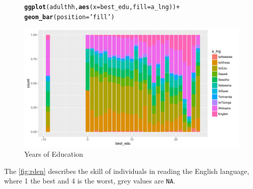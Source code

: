 \documentclass[a4paper,british]{article}\usepackage[]{graphicx}\usepackage[]{color}
\makeatletter
\def\maxwidth{ %
  \ifdim\Gin@nat@width>\linewidth
    \linewidth
  \else
    \Gin@nat@width
  \fi
}
\newcommand{\hlstr}[1]{\textcolor[rgb]{0.192,0.494,0.8}{#1}}%
\newcommand{\hlopt}[1]{\textcolor[rgb]{0,0,0}{#1}}%
\newcommand{\hlstd}[1]{\textcolor[rgb]{0.345,0.345,0.345}{#1}}%
\newcommand{\hlkwc}[1]{\textcolor[rgb]{0.333,0.667,0.333}{#1}}%
\newcommand{\hlkwd}[1]{\textcolor[rgb]{0.737,0.353,0.396}{\textbf{#1}}}%
\newenvironment{kframe}{%
 \def\at@end@of@kframe{}%
 \ifinner\ifhmode%
  \def\at@end@of@kframe{\end{minipage}}%
  \begin{minipage}{\columnwidth}%
 \fi\fi%
 \def\FrameCommand##1{\hskip\@totalleftmargin \hskip-\fboxsep
 \colorbox{shadecolor}{##1}\hskip-\fboxsep
     \hskip-\linewidth \hskip-\@totalleftmargin \hskip\columnwidth}%
 \MakeFramed {\advance\hsize-\width
   \@totalleftmargin\z@ \linewidth\hsize
   \@setminipage}}%
 {\par\unskip\endMakeFramed%
 \at@end@of@kframe}
\newenvironment{knitrout}{}{} %
\newcommand{\code}[1]{\texttt{#1}}
\let\ref\autoref
\makeatother
\begin{document}
\begin{figure}[H]

\caption{Years of Education}

\label{fig:bestedu}

\begin{knitrout}
\color{fgcolor}\begin{kframe}
\begin{alltt}
\hlkwd{ggplot}\hlstd{(adulthh,} \hlkwd{aes}\hlstd{(}\hlkwc{x}\hlstd{=best_edu,} \hlkwc{fill}\hlstd{=a_lng ))} \hlopt{+}
    \hlkwd{geom_bar}\hlstd{(}\hlkwc{position} \hlstd{=} \hlstr{'fill'}\hlstd{)}
\end{alltt}
\end{kframe}
\includegraphics[width=\maxwidth]{../Making-Next-Billion-Demand-Access/misc/latex-best_edu-1} 

\end{knitrout}
\end{figure}

The \ref{fig:rden} describes the skill of individuals in reading
the English language, where 1 the best and 4 is the worst, grey values
are \code{NA}.
\end{document}
